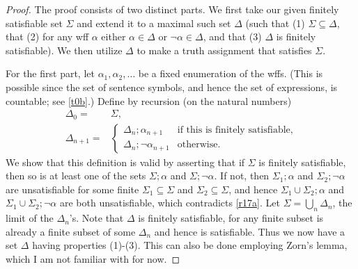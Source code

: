 \begin{proof}
  The proof consists of two distinct parts. We first take our given finitely satisfiable set $\Sigma$ and extend it to a maximal such set $\Delta$ (such that (1) $\Sigma\subseteq \Delta$, that (2) for any wff $\alpha$ either $\alpha\in \Delta$ or $\neg \alpha\in \Delta$, and that (3) $\Delta$ is finitely satisfiable). We then utilize $\Delta$ to make a truth assignment that satisfies $\Sigma$.

  For the first part, let $\alpha_1,\alpha_2,\dots$ be a fixed enumeration of the wffs. (This is possible since the set of sentence symbols, and hence the set of expressions, is countable; see \ref{t0b}.) Define by recursion (on the natural numbers)
  \begin{align*}
    \Delta_0=     & \Sigma,                                                              \\
    \Delta_{n+1}= & \begin{cases}
                      \Delta_n;\alpha_{n+1}      & \text{if this is finitely satisfiable}, \\
                      \Delta_n;\neg \alpha_{n+1} & \text{otherwise}.
                    \end{cases}
  \end{align*}
  We show that this definition is valid by asserting that if $\Sigma$ is finitely satisfiable, then so is at least one of the sets $\Sigma;\alpha$ and $\Sigma;\neg \alpha$. If not, then $\Sigma_1;\alpha$ and $\Sigma_2;\neg \alpha$ are unsatisfiable for some finite $\Sigma_1\subseteq \Sigma$ and $\Sigma_2\subseteq \Sigma$, and hence $\Sigma_1\cup \Sigma_2;\alpha$ and $\Sigma_1\cup \Sigma_2;\neg \alpha$ are both unsatisfiable, which contradicts \ref{r17a}. Let $\Sigma=\bigcup_n \Delta_n$, the limit of the $\Delta_n$'s. Note that $\Delta$ is finitely satisfiable, for any finite subset is already a finite subset of some $\Delta_n$ and hence is satisfiable. Thus we now have a set $\Delta$ having properties (1)-(3). This can also be done employing Zorn's lemma, which I am not familiar with for now.


\end{proof}
